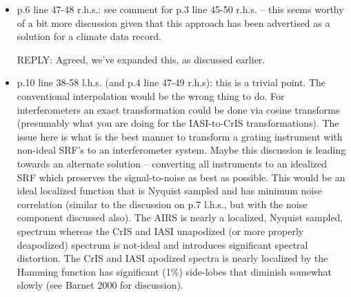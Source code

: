 \documentclass[11pt]{article}
\newcommand {\reply} {\mbox{\small REPLY}}
\begin{document}
\begin{itemize}

% 
% 

\item p.6 line 47-48 r.h.s.: see comment for p.3 line 45-50 r.h.s. –
  this seems worthy of a bit more discussion given that this
  approach has been advertised as a solution for a climate data
  record.

  \reply: Agreed, we've expanded this, as discussed earlier.

\item p.10 line 38-58 l.h.s. (and p.4 line 47-49 r.h.s): this is a
  trivial point. The conventional interpolation would be the wrong
  thing to do. For interferometers an exact transformation could be
  done via cosine transforms (presumably what you are doing for the
  IASI-to-CrIS transformations). The issue here is what is the best
  manner to transform a grating instrument with non-ideal SRF’s to
  an interferometer system. Maybe this discussion is leading towards
  an alternate solution – converting all instruments to an idealized
  SRF which preserves the signal-to-noise as best as possible. This
  would be an ideal localized function that is Nyquist sampled and
  has minimum noise correlation (similar to the discussion on p.7
  l.h.s., but with the noise component discussed also). The AIRS is
  nearly a localized, Nyquist sampled, spectrum whereas the CrIS and
  IASI unapodized (or more properly deapodized) spectrum is
  not-ideal and introduces significant spectral distortion. The CrIS
  and IASI apodized spectra is nearly localized by the Hamming
  function has significant (1\%) side-lobes that diminish somewhat
  slowly (see Barnet 2000 for discussion).


\end{itemize}
\end{document}
